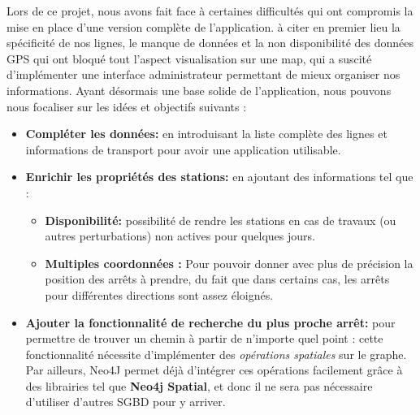 Lors de ce projet, nous avons fait face à certaines difficultés qui ont compromis la mise en place d'une version complète de l'application. à citer en premier lieu la spécificité de nos lignes, le manque de données et la non disponibilité des données GPS qui ont bloqué tout l'aspect visualisation sur une map, qui a suscité d'implémenter une interface administrateur permettant de mieux organiser nos informations.\newline\newline
Ayant désormais une base solide de l'application, nous pouvons nous focaliser sur les idées et objectifs suivants :
\begin{itemize}
	\item \textbf{Compléter les données:} en introduisant la liste complète des lignes et informations de transport pour avoir une application utilisable.
	
	\item \textbf{Enrichir les propriétés des stations: }en ajoutant des informations tel que :
		\begin{itemize}
			\item \textbf{Disponibilité:} possibilité de rendre les stations en cas de travaux (ou autres perturbations) non actives pour quelques jours.
			\item \textbf{Multiples coordonnées :} Pour pouvoir donner avec plus de précision la position des arrêts à prendre, du fait que dans certains cas, les arrêts pour différentes directions sont assez éloignés.
		\end{itemize}
		
	\item \textbf{Ajouter la fonctionnalité de recherche du plus proche arrêt: } pour permettre de trouver un chemin à partir de n'importe quel point : cette fonctionnalité nécessite d'implémenter des \emph{opérations spatiales} sur le graphe. Par ailleurs, Neo4J permet déjà d'intégrer ces opérations facilement grâce à des librairies tel que \textbf{Neo4j Spatial}, et donc il ne sera pas nécessaire d'utiliser d'autres SGBD pour y arriver.


\end{itemize}
